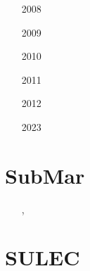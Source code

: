 \begin{small}
\begin{itemize}
\item[2008]
\textcite{samu08} 
\item[2009]
\textcite{samu09} 
\item[2010]
\textcite{saev10}
\item[2011]
\textcite{saad11}
\item[2012]
\textcite{samu12b}
\item[2023]
\textcite{sasa23}
\end{itemize}
\end{small}

\section{SubMar} 

\begin{small}
\begin{itemize}
\item[\twothousandsix]       \textcite{masr06}
\item[\twothousandseven]     \textcite{masp07}
\item[\twothousandten]       \textcite{roms10}
\item[\twothousandtwelve]    \textcite{rosm12}
\item[\twothousandthirteen]  \textcite{rems13}
\item[\twothousandseventeen] \textcite{rerm17}
\item[\twothousandeighteen]  \textcite{marc18}
\item[\twothousandnineteen]  \textcite{rors19}
\item[\twothousandtwenty]    \textcite{rozr20}, \textcite{relr20}
\item[\twothousandtwentyone] \textcite{resr21}
\item[\twothousandtwentytwo] \textcite{bors22}
\end{itemize}
\end{small}

\section{SULEC}

